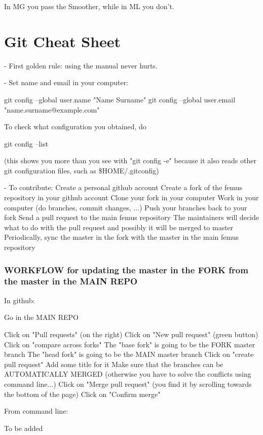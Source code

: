 \documentclass[10pt]{book}
\begin{document}
 In MG you pass the Smoother, while in ML you don't.
 
 
 
 
\part{Git Cheat Sheet}


- First golden rule: using the manual never hurts.

- Set name and email in your computer:

  git config --global user.name "Name Surname"
  git config --global user.email "name.surname@example.com"

  To check what configuration you obtained, do 

  git config --list 

  (this shows you more than you see with "git config -e"
  because it also reads other git configuration files,
  such as \$HOME/.gitconfig)

- To contribute:
  Create a personal github account 
  Create a fork of the femus repository in your github account
  Clone your fork in your computer
  Work in your computer (do branches, commit changes, ...)
  Push your branches back to your fork 
  Send a pull request to the main femus repository
  The maintainers will decide what to do with the pull request and possibly it will be merged to master
  Periodically, sync the master in the fork with the master in the main femus repository


\section{WORKFLOW for updating the master in the FORK from the master in the MAIN REPO}


In github:

Go in the MAIN REPO

Click on "Pull requests" (on the right)
Click on "New pull request" (green button)
Click on "compare across forks"
The "base fork" is going to be the FORK master branch
The "head fork" is going to be the MAIN master branch
Click on "create pull request"
Add some title for it
Make sure that the branches can be AUTOMATICALLY MERGED (otherwise you have to solve the conflicts using command line...)
Click on "Merge pull request" (you find it by scrolling towards the bottom of the page)
Click on "Confirm merge"

From command line:

To be added
\end{document}
